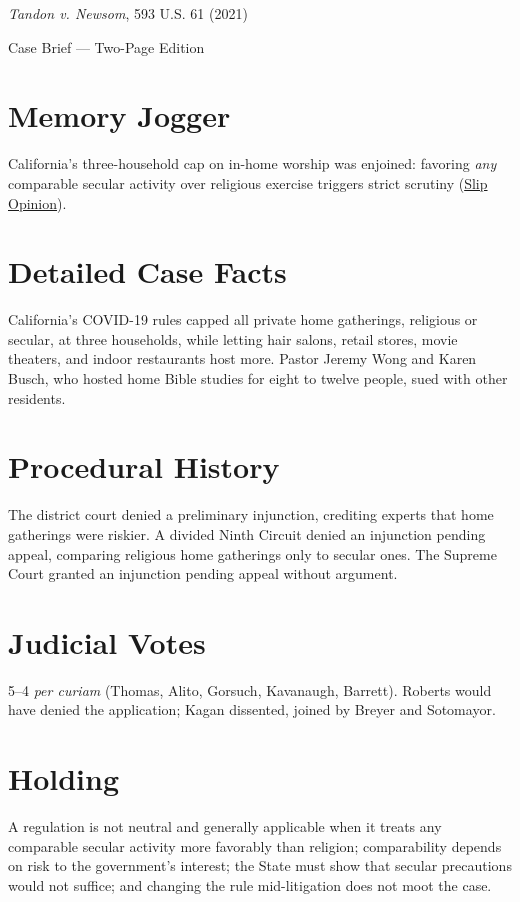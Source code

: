 \documentclass[12pt]{article}
\begin{document}
\begin{center}
{\LARGE \textit{Tandon v. Newsom}, 593 U.S. 61 (2021)\par}
\vspace{0.5em}
{\large Case Brief --- Two-Page Edition\par}
\end{center}

\section{Memory Jogger}
California's three-household cap on in-home worship was enjoined: favoring \textit{any} comparable secular activity over religious exercise triggers strict scrutiny (\href{https://www.supremecourt.gov/opinions/20pdf/20a151_4g15.pdf}{Slip Opinion}).

\section{Detailed Case Facts}
California's COVID-19 rules capped all private home gatherings, religious or secular, at three households, while letting hair salons, retail stores, movie theaters, and indoor restaurants host more. Pastor Jeremy Wong and Karen Busch, who hosted home Bible studies for eight to twelve people, sued with other residents.

\section{Procedural History}
The district court denied a preliminary injunction, crediting experts that home gatherings were riskier. A divided Ninth Circuit denied an injunction pending appeal, comparing religious home gatherings only to secular ones. The Supreme Court granted an injunction pending appeal without argument.

\section{Judicial Votes}
5--4 \textit{per curiam} (Thomas, Alito, Gorsuch, Kavanaugh, Barrett). Roberts would have denied the application; Kagan dissented, joined by Breyer and Sotomayor.

\section{Holding}
A regulation is not neutral and generally applicable when it treats any comparable secular activity more favorably than religion; comparability depends on risk to the government's interest; the State must show that secular precautions would not suffice; and changing the rule mid-litigation does not moot the case.
\end{document}

